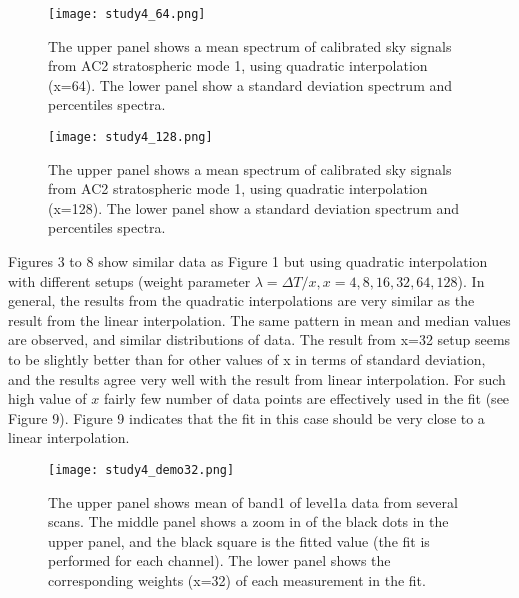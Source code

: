\begin{figure}[!t]
\centering
\texttt{[image: study4\_64.png]}\\
\caption{The upper panel shows a mean spectrum of calibrated
sky signals from AC2 stratospheric mode 1,
using quadratic interpolation (x=64). 
The lower panel show a standard deviation spectrum
and percentiles spectra.}
\label{fig:study4_64.png}
\end{figure}

\begin{figure}[!t]
\centering
\texttt{[image: study4\_128.png]}\\
\caption{The upper panel shows a mean spectrum of calibrated
sky signals from AC2 stratospheric mode 1,
using quadratic interpolation (x=128). 
The lower panel show a standard deviation spectrum
and percentiles spectra.}
\label{fig:study4_.png}
\end{figure}

Figures 3 to 8 show similar data as Figure 1 but using quadratic
interpolation with different setups
(weight parameter \(\lambda = \Delta T /x, x=4,8,16,32,64,128\)). 
In general, the results from the quadratic interpolations
are very similar as the result from the linear interpolation.
The same pattern in mean and median values are observed, and
similar distributions of data.
The result from x=32 setup seems to be slightly better
than for other values of x in terms of standard deviation,
and the results agree very well with the result from linear interpolation.
For such high value of \(x\) fairly few number of data
points are effectively used in the fit (see Figure 9).
Figure 9 indicates that the fit in this case should be 
very close to a linear interpolation.

   

\begin{figure}[!t]
\centering
\texttt{[image: study4\_demo32.png]}\\
\caption{The upper panel shows mean of band1 of level1a data
from several scans.
The middle panel shows a zoom in of the black dots in the upper panel,
and the black square is the fitted value
(the fit is performed for each channel). 
The lower panel shows the corresponding weights (x=32) of each measurement 
in the fit. }
\label{fig:study4_dem32.png}
\end{figure}

